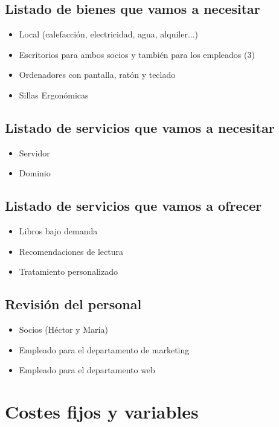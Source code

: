 \documentclass[openany,overnay,a4paper, twoside, 12pt]{book}
\begin{document}
\subsection{Listado de bienes que vamos a necesitar}
\begin{itemize}
    \item Local (calefacción, electricidad, agua, alquiler...)
    \item Escritorios para ambos socios y también para los empleados (3)
    \item Ordenadores con pantalla, ratón y teclado
    \item Sillas Ergonómicas
\end{itemize}
\subsection{Listado de servicios que vamos a necesitar}
\begin{itemize}
    \item Servidor
    \item Dominio
\end{itemize}
\subsection{Listado de servicios que vamos a ofrecer}
\begin{itemize}
    \item Libros bajo demanda
    \item Recomendaciones de lectura
    \item Tratamiento personalizado
    
\end{itemize}
\subsection{Revisión del personal}
\begin{itemize}
    \item Socios (Héctor y María)
    \item Empleado para el departamento de marketing
    \item Empleado para el departamento web
\end{itemize}
\newpage
\section{Costes fijos y variables}
\end{document}
